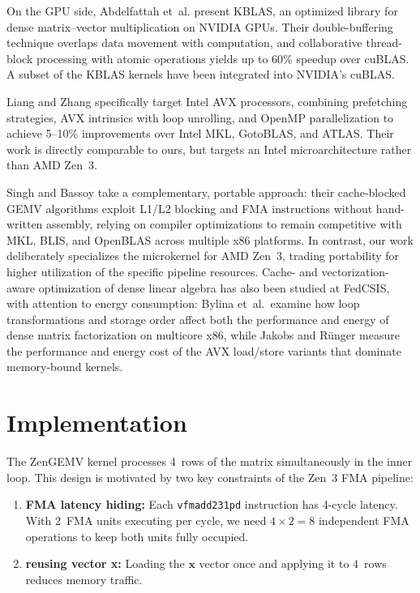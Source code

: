 \documentclass[conference]{IEEEtran}
\begin{document}
On the GPU side, Abdelfattah et~al.\cite{kblas} present KBLAS, an optimized
library for dense matrix--vector multiplication on NVIDIA GPUs. Their
double-buffering technique overlaps data movement with computation, and
collaborative thread-block processing with atomic operations yields up to 60\%
speedup over cuBLAS. A subset of the KBLAS kernels have been integrated into
NVIDIA's cuBLAS.

Liang and Zhang\cite{liang2016gemv} specifically target Intel
AVX processors, combining prefetching strategies, AVX intrinsics with loop
unrolling, and OpenMP parallelization to achieve 5--10\% improvements over Intel
MKL, GotoBLAS, and ATLAS. Their work is directly comparable to ours, but targets
an Intel microarchitecture rather than AMD Zen~3. 

Singh and Bassoy\cite{singh2021gemv} take a complementary, portable approach: their
cache-blocked GEMV algorithms exploit L1/L2 blocking and FMA instructions
without hand-written assembly, relying on compiler optimizations to remain
competitive with MKL, BLIS, and OpenBLAS across multiple x86 platforms. In
contrast, our work deliberately specializes the microkernel for AMD Zen~3,
trading portability for higher utilization of the specific pipeline resources.
Cache- and vectorization-aware optimization of dense linear algebra has also
been studied at FedCSIS, with attention to energy consumption: Bylina et~al.\
examine how loop transformations and storage order affect both the performance
and energy of dense matrix factorization on multicore x86\cite{bylina2022wz},
while Jakobs and R\"unger measure the performance and energy cost of the AVX
load/store variants that dominate memory-bound kernels\cite{jakobs2018avx}.


\section{Implementation}

The ZenGEMV kernel processes 4~rows of the matrix simultaneously in the inner
loop. This design is motivated by two key constraints of the Zen~3 FMA pipeline:

\begin{enumerate}
\item \textbf{FMA latency hiding:} Each \texttt{vfmadd231pd} instruction has
      4-cycle latency\cite{fog2011instruction}. With 2~FMA units executing per cycle, we need
      $4 \times 2 = 8$ independent FMA operations to keep both units fully occupied.
\item \textbf{reusing vector x:} Loading the $\mathbf{x}$ vector once and
      applying it to 4~rows reduces memory traffic.
\end{enumerate}
\end{document}
